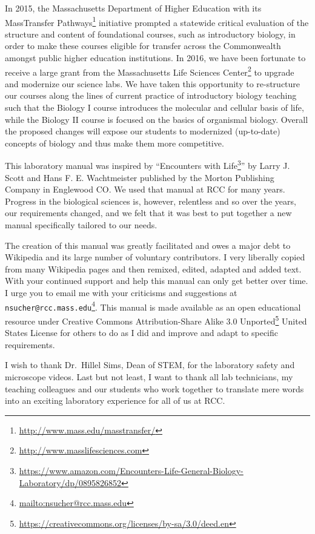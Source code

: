 \documentclass[]{book}
\let\rmarkdownfootnote\footnote%
\def\footnote{\protect\rmarkdownfootnote}
\renewcommand{\href}[2]{#2\footnote{\url{#1}}}
\theoremstyle{definition}
\theoremstyle{definition}
\theoremstyle{definition}
\theoremstyle{remark}
\begin{document}
In 2015, the Massachusetts Department of Higher Education with its
\href{http://www.mass.edu/masstransfer/}{MassTransfer Pathways}
initiative prompted a statewide critical evaluation of the structure and
content of foundational courses, such as introductory biology, in order
to make these courses eligible for transfer across the Commonwealth
amongst public higher education institutions. In 2016, we have been
fortunate to receive a large grant from the
\href{http://www.masslifesciences.com}{Massachusetts Life Sciences
Center} to upgrade and modernize our science labs. We have taken this
opportunity to re-structure our courses along the lines of current
practice of introductory biology teaching such that the Biology I course
introduces the molecular and cellular basis of life, while the Biology
II course is focused on the basics of organismal biology. Overall the
proposed changes will expose our students to modernized (up-to-date)
concepts of biology and thus make them more competitive.

This laboratory manual was inspired by
``\href{https://www.amazon.com/Encounters-Life-General-Biology-Laboratory/dp/0895826852}{Encounters
with Life}'' by Larry J. Scott and Hans F. E. Wachtmeister published by
the Morton Publishing Company in Englewood CO. We used that manual at
RCC for many years. Progress in the biological sciences is, however,
relentless and so over the years, our requirements changed, and we felt
that it was best to put together a new manual specifically tailored to
our needs.

The creation of this manual was greatly facilitated and owes a major
debt to Wikipedia and its large number of voluntary contributors. I very
liberally copied from many Wikipedia pages and then remixed, edited,
adapted and added text. With your continued support and help this manual
can only get better over time. I urge you to email me with your
criticisms and suggestions at
\href{mailto:nsucher@rcc.mass.edu}{\nolinkurl{nsucher@rcc.mass.edu}}.
This manual is made available as an open educational resource under
\href{https://creativecommons.org/licenses/by-sa/3.0/deed.en}{Creative
Commons Attribution-Share Alike 3.0 Unported} United States License for
others to do as I did and improve and adapt to specific requirements.

I wish to thank Dr.~Hillel Sims, Dean of STEM, for the laboratory safety
and microscope videos. Last but not least, I want to thank all lab
technicians, my teaching colleagues and our students who work together
to translate mere words into an exciting laboratory experience for all
of us at RCC.
\end{document}
